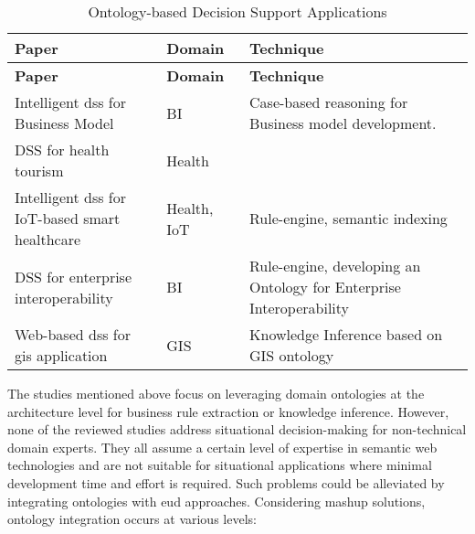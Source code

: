 \hypertarget{tbl:ontology-dss}{}
\begin{longtable}{@{}p{0.33\linewidth} p{0.18\linewidth} p{0.49\linewidth}@{}}
\caption{\label{tbl:ontology-dss} Ontology-based Decision Support Applications}\tabularnewline
\toprule
\textbf{Paper} & \textbf{Domain} & \textbf{Technique} \\
\midrule
\endfirsthead

\toprule
\textbf{Paper} & \textbf{Domain} & \textbf{Technique} \\
\midrule
\endhead

\bottomrule
\endlastfoot

Intelligent \gls{dss} for Business Model  \autocite{Hamrouni2021} & BI &
Case-based reasoning for Business model development. \\

DSS for health tourism  \autocite{Spoladore2023}& Health & \\

Intelligent \gls{dss} for IoT-based smart healthcare \autocite{Saha2021}& Health, IoT & 
Rule-engine, semantic indexing \\

DSS for enterprise interoperability \autocite{Zouch2018} & BI &
Rule-engine, developing an Ontology for Enterprise Interoperability \\

Web-based \gls{dss} for \gls{gis} application \autocite{Vahidnia2023} & GIS &
Knowledge Inference based on GIS ontology \\

\end{longtable}


The studies mentioned above focus on leveraging domain ontologies at the architecture level for business rule extraction or knowledge inference. However, none of the reviewed studies address situational decision-making for non-technical domain experts. They all assume a certain level of expertise in semantic web technologies and are not suitable for situational applications where minimal development time and effort is required.
Such problems could be alleviated by integrating ontologies with \gls{eud} approaches. Considering mashup solutions, ontology integration occurs at various levels: 

